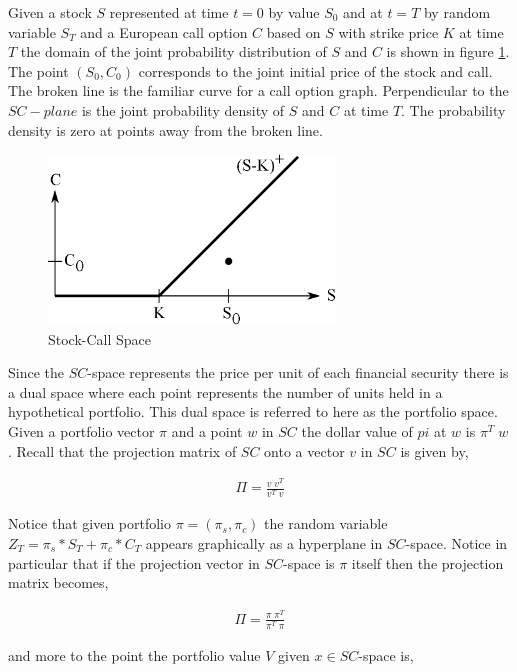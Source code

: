 Given a stock $S$ represented at time $t=0$ by value $S_0$ and at $t=T$ by random variable $S_T$ and a European call option $C$ based on $S$ with strike price $K$ at time $T$ the domain of the joint probability distribution of $S$ and $C$ is shown in figure \ref{fig:SC}. The point $(S_0, C_0)$ corresponds to the joint initial price of the stock and call. The broken line is the familiar curve for a call option graph. Perpendicular to the $SC-plane$ is the joint probability density of $S$ and $C$ at time $T$. The probability density is zero at points away from the broken line.

\begin{figure}
  \centering
  \includegraphics[width=3in]{Images/SC.eps}
  \caption[Stock-Call Space]
          {Stock-Call Space}
  \label{fig:SC}
\end{figure}

Since the $SC$-space represents the price per unit of each financial security there is a dual space where each point represents the number of units held in a hypothetical portfolio. This dual space is referred to here as the portfolio space. Given a portfolio vector $\pi$ and a point $w$ in $SC$ the dollar value of $pi$ at $w$ is $\pi^T\;w$. Recall that the projection matrix of $SC$ onto a vector $v$ in $SC$ is given by,

\begin{align*}
\Pi = \frac{v\;v^T}{v^T\;v}
\end{align*}

Notice that given portfolio $\pi = (\pi_s, \pi_c)$ the random variable $Z_T = \pi_s * S_T + \pi_c * C_T$ appears graphically as a hyperplane in $SC$-space. Notice in particular that if the projection vector in $SC$-space is $\pi$ itself then the projection matrix becomes,

\begin{align*}
\Pi = \frac{\pi\;\pi^T}{\pi^T\;\pi}
\end{align*}

and more to the point the portfolio value $V$ given $x \in SC$-space is,

